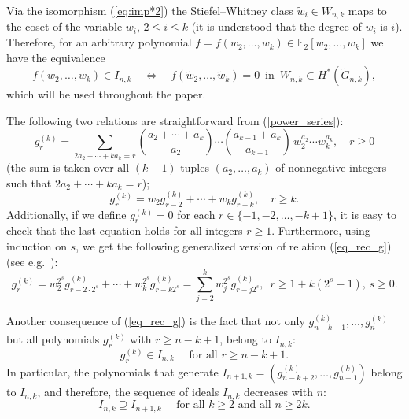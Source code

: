 \documentclass{amsart}
\theoremstyle{definition}
\theoremstyle{remark}
\numberwithin{equation}{section}
\newcommand{\F}{\mathbb F}
\newcommand{\gr}{\widetilde G}
\newcommand{\w}{\widetilde w}
\renewcommand{\le}{\leqslant}
\renewcommand{\ge}{\geqslant}
\begin{document}
Via the isomorphism (\ref{eq:imp*2}) the Stiefel--Whitney class $\w_i\in W_{n,k}$ maps to the coset of the variable $w_i$, $2\le i\le k$ (it is understood that the degree of $w_i$ is $i$). Therefore, for an arbitrary polynomial $f=f(w_2,\ldots,w_k)\in\F_2[w_2,\ldots,w_k]$ we have the equivalence
\[f(w_2,\ldots,w_k)\in I_{n,k} \quad \Longleftrightarrow \quad f(\w_2,\ldots,\w_k)=0 \,\mbox{ in } \, W_{n,k}\subset H^*(\gr_{n,k}),\]
which will be used throughout the paper.


The following two relations are straightforward from (\ref{power_series}):
	\begin{equation}\label{eq_explicitly_g}
		g_r^{(k)} = \sum_{2a_2+\cdots +ka_k = r} \binom{a_2+\cdots +a_k}{a_2}\cdots\binom{a_{k-1} + a_k}{a_{k-1}}\,  w_2^{a_2}\cdots w_k^{a_k},\quad r\ge0
	\end{equation}
    (the sum is taken over all $(k-1)$-tuples $(a_2,\ldots,a_k)$ of nonnegative integers such that $2a_2+\cdots +ka_k = r$);
	\begin{equation}\label{eq_rec_g}
		g_r^{(k)} =   w_2 g_{r-2}^{(k)} + \cdots +   w_k g_{r-k}^{(k)}, \quad r\ge k.
	\end{equation}
    Additionally, if we define $g_r^{(k)}=0$ for each $r\in\{-1,-2,\ldots,-k+1\}$, it is easy to check that the last equation holds for all integers $r\ge1$. Furthermore, using induction on $s$, we get the following generalized version of relation (\ref{eq_rec_g}) (see e.g.\ \cite[(2.8)]{CJP}):
	\begin{equation}\label{eq_rec_g_gen}
		g_r^{(k)} \!=  w_2^{2^s} g_{r-2\cdot 2^s}^{(k)} + \cdots +   w_k^{2^s} g_{r-k2^s}^{(k)}=\!\sum_{j=2}^kw_j^{2^s} g_{r-j2^s}^{(k)}, \,\,\, r\geqslant1+k(2^s-1),\, s\geqslant0.
	\end{equation}
     

Another consequence of (\ref{eq_rec_g}) is the fact that not only $g_{n-k+1}^{(k)},\dots ,g_n^{(k)}$ but all polynomials $g_r^{(k)}$ with $r\ge n-k+1$, belong to $I_{n,k}$:
\begin{equation}\label{g_rinIn,k}
    g_r^{(k)}\in I_{n,k} \quad \mbox{ for all } r\ge n-k+1.
\end{equation}
In particular, the polynomials that generate $I_{n+1,k}=(g_{n-k+2}^{(k)},\dots ,g_{n+1}^{(k)})$ belong to $I_{n,k}$, and therefore, the sequence of ideals $I_{n,k}$ decreases with $n$:
    \begin{equation}\label{In,k opada}
       I_{n,k}\supseteq I_{n+1,k} \quad \mbox{ for all } k\ge2 \mbox{ and all } n\ge2k. 
    \end{equation}
    
\end{document}
